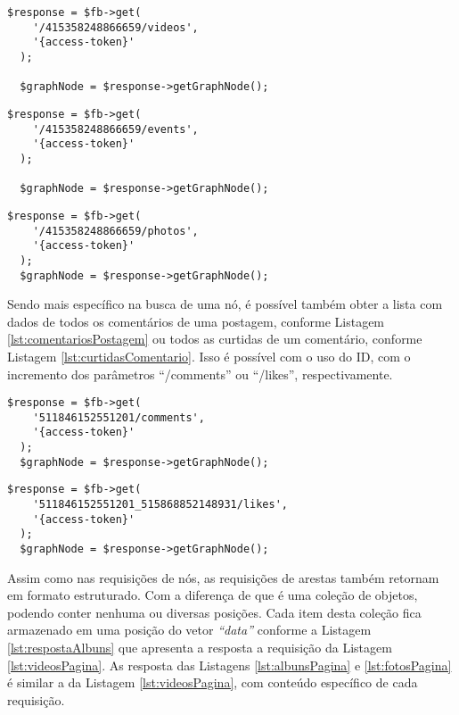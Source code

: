 \begin{lstlisting}[caption={Requisitar os vídeos publicados na página},label={lst:videosPagina},float]
  $response = $fb->get( 
    '/415358248866659/videos', 
    '{access-token}'
  );
  
  $graphNode = $response->getGraphNode();
\end{lstlisting}

\begin{lstlisting}[caption={Requisitar os eventos agendados pela página},label={lst:eventosPagina}]
  $response = $fb->get( 
    '/415358248866659/events', 
    '{access-token}'
  );
  
  $graphNode = $response->getGraphNode();
\end{lstlisting}


\begin{lstlisting}[caption={Requisitar as fotos de perfil publicadas na página},label={lst:fotosPagina}]
  $response = $fb->get( 
    '/415358248866659/photos', 
    '{access-token}'
  );
  $graphNode = $response->getGraphNode();
\end{lstlisting}

Sendo mais específico na busca de uma nó, é possível também obter a lista com dados de todos os comentários de uma postagem, conforme Listagem \ref{lst:comentariosPostagem} ou todos as curtidas de um comentário, conforme Listagem \ref{lst:curtidasComentario}. Isso é possível com o uso do ID, com o incremento dos parâmetros ``/comments'' ou ``/likes'', respectivamente.

\begin{lstlisting}[caption={Requisitar todos os comentários de uma postagem em uma página},label={lst:comentariosPostagem}]
  $response = $fb->get( 
    '511846152551201/comments', 
    '{access-token}'
  );
  $graphNode = $response->getGraphNode();
\end{lstlisting}

\begin{lstlisting}[caption={Requisitar todas as curtidas de um comentário},label={lst:curtidasComentario}]
  $response = $fb->get( 
    '511846152551201_515868852148931/likes', 
    '{access-token}'
  );
  $graphNode = $response->getGraphNode();
\end{lstlisting}

Assim como nas requisições de nós, as requisições de arestas também retornam em formato estruturado. Com a diferença de que é uma coleção de objetos, podendo conter nenhuma ou diversas posições. Cada item desta coleção fica armazenado em uma posição do vetor \textit{``data''} conforme a Listagem \ref{lst:respostaAlbuns} que apresenta a resposta a requisição da Listagem \ref{lst:videosPagina}. As resposta das Listagens \ref{lst:albunsPagina} e \ref{lst:fotosPagina} é similar a da Listagem \ref{lst:videosPagina}, com conteúdo específico de cada requisição. 

